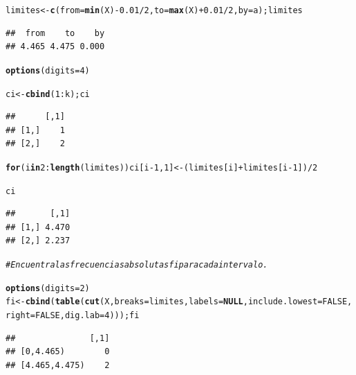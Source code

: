 \documentclass[12pt,letterpaper]{article}\usepackage[]{graphicx}\usepackage[]{color}
\makeatletter
\newcommand{\hlnum}[1]{\textcolor[rgb]{0.686,0.059,0.569}{#1}}%
\newcommand{\hlcom}[1]{\textcolor[rgb]{0.678,0.584,0.686}{\textit{#1}}}%
\newcommand{\hlopt}[1]{\textcolor[rgb]{0,0,0}{#1}}%
\newcommand{\hlstd}[1]{\textcolor[rgb]{0.345,0.345,0.345}{#1}}%
\newcommand{\hlkwa}[1]{\textcolor[rgb]{0.161,0.373,0.58}{\textbf{#1}}}%
\newcommand{\hlkwb}[1]{\textcolor[rgb]{0.69,0.353,0.396}{#1}}%
\newcommand{\hlkwc}[1]{\textcolor[rgb]{0.333,0.667,0.333}{#1}}%
\newcommand{\hlkwd}[1]{\textcolor[rgb]{0.737,0.353,0.396}{\textbf{#1}}}%
\newenvironment{kframe}{%
 \def\at@end@of@kframe{}%
 \ifinner\ifhmode%
  \def\at@end@of@kframe{\end{minipage}}%
  \begin{minipage}{\columnwidth}%
 \fi\fi%
 \def\FrameCommand##1{\hskip\@totalleftmargin \hskip-\fboxsep
 \colorbox{shadecolor}{##1}\hskip-\fboxsep
     \hskip-\linewidth \hskip-\@totalleftmargin \hskip\columnwidth}%
 \MakeFramed {\advance\hsize-\width
   \@totalleftmargin\z@ \linewidth\hsize
   \@setminipage}}%
 {\par\unskip\endMakeFramed%
 \at@end@of@kframe}
\newenvironment{knitrout}{}{} %
\makeatother
\begin{document}
\begin{enumerate}
\begin{knitrout}
\begin{kframe}
\begin{alltt}
\hlstd{limites} \hlkwb{<-} \hlkwd{c}\hlstd{(}\hlkwc{from} \hlstd{=} \hlkwd{min}\hlstd{(X)}\hlopt{-}\hlnum{0.01}\hlopt{/}\hlnum{2}\hlstd{,} \hlkwc{to} \hlstd{=} \hlkwd{max}\hlstd{(X)}\hlopt{+}\hlnum{0.01}\hlopt{/}\hlnum{2}\hlstd{,} \hlkwc{by}\hlstd{=a); limites}
\end{alltt}
\begin{verbatim}
##  from    to    by 
## 4.465 4.475 0.000
\end{verbatim}
\begin{alltt}
\hlkwd{options}\hlstd{(}\hlkwc{digits}\hlstd{=}\hlnum{4}\hlstd{)}
\end{alltt}
\end{kframe}
\end{knitrout}

\begin{knitrout}
\color{fgcolor}\begin{kframe}
\begin{alltt}
\hlstd{ci} \hlkwb{<-} \hlkwd{cbind}\hlstd{(}\hlnum{1}\hlopt{:}\hlstd{k); ci}
\end{alltt}
\begin{verbatim}
##      [,1]
## [1,]    1
## [2,]    2
\end{verbatim}
\begin{alltt}
\hlkwa{for}\hlstd{(i} \hlkwa{in} \hlnum{2}\hlopt{:}\hlkwd{length}\hlstd{(limites)) ci[i}\hlopt{-}\hlnum{1}\hlstd{,} \hlnum{1}\hlstd{]} \hlkwb{<-} \hlstd{(limites[i]}\hlopt{+} \hlstd{limites[i}\hlopt{-}\hlnum{1}\hlstd{])}\hlopt{/}\hlnum{2}

\hlstd{ci}
\end{alltt}
\begin{verbatim}
##       [,1]
## [1,] 4.470
## [2,] 2.237
\end{verbatim}
\end{kframe}
\end{knitrout}

\begin{knitrout}
\color{fgcolor}\begin{kframe}
\begin{alltt}
\hlcom{# Encuentra las frecuencias absolutas fi para cada intervalo.}

\hlkwd{options}\hlstd{(}\hlkwc{digits}\hlstd{=}\hlnum{2}\hlstd{)}
\hlstd{fi} \hlkwb{<-} \hlkwd{cbind}\hlstd{(}\hlkwd{table}\hlstd{(}\hlkwd{cut}\hlstd{(X,} \hlkwc{breaks} \hlstd{= limites,} \hlkwc{labels}\hlstd{=}\hlkwa{NULL}\hlstd{,} \hlkwc{include.lowest}\hlstd{=}\hlnum{FALSE}\hlstd{,}
\hlkwc{right}\hlstd{=}\hlnum{FALSE}\hlstd{,} \hlkwc{dig.lab}\hlstd{=}\hlnum{4}\hlstd{))); fi}
\end{alltt}
\begin{verbatim}
##               [,1]
## [0,4.465)        0
## [4.465,4.475)    2
\end{verbatim}
\end{kframe}
\end{knitrout}


\end{enumerate}
\end{document}

